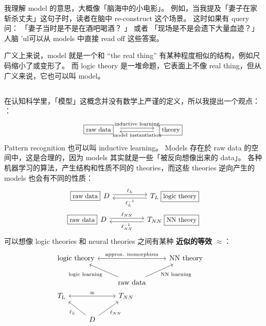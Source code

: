 我理解 model 的意思，大概像「脑海中的小电影」。 例如，当我提及「妻子在家斩杀丈夫」这句子时，读者在脑中 re-construct 这个场景。 这时如果有 query 问： 「妻子当时是不是在酒吧喝酒？ 」 或者 「现场是不是会遗下大量血迹？」  人脑 'ul{可以从 models 中直接 read off 这些答案}。 

广义上来说，model 就是一个和 ``the real thing'' 有某种程度相似的结构，例如尺码缩小了或变形了。  而 logic theory 是一堆命题，它表面上不像 real thing，但从广义来说，它也可以叫 model。

\subsection{}

在认知科学里，「模型」这概念并没有数学上严谨的定义，所以我提出一个观点： \textbf{}：
\begin{equation}
\begin{tikzcd}
\boxed{raw data} \; \arrow[shift left]{rr}{\text{inductive learning}} && \; \boxed{theory} \arrow[shift left]{ll}{\text{model instantiation}}
\end{tikzcd}
\end{equation}
Pattern recognition 也可以叫 inductive learning。  Models 存在於 raw data 的空间中，这是合理的，因为 models 其实就是一些「被反向想像出来的 data」。  各种机器学习的算法，产生结构和性质不同的 theories，而这些 theories 逆向产生的 models 也会有不同的性质：
\begin{eqnarray}
\begin{tikzcd}
\boxed{raw data} \; D \arrow[shift left]{rr}{\ell_L} && T_L \; \boxed{logic theory} \arrow[shift left]{ll}{\ell^{-1}_L}
\end{tikzcd}
\\
\begin{tikzcd}
\boxed{raw data} \; D \arrow[shift left]{rr}{\ell_{NN}} && T_{NN} \; \boxed{NN theory} \arrow[shift left]{ll}{\ell^{-1}_{NN}}
\end{tikzcd}
\end{eqnarray}
可以想像 logic theories 和 neural theories 之间有某种 \textbf{近似的等效} $\approx$： 
\begin{eqnarray}
& \begin{tikzcd}
	\text{logic theory} \arrow[leftrightarrow]{rr}{\text{approx. isomorphism}} && \text{NN theory} \\
	& \text{raw data} \arrow{ul}{\text{logic learning}} \arrow{ur}[swap]{\text{NN learning}}
\end{tikzcd} &
\nonumber \\
& \begin{tikzcd}
	T_{\text{L}} \arrow[leftrightarrow]{rr}{\approx} && T_{NN} \\
		& D \arrow{ul}{\ell_{L}} \arrow{ur}[swap]{\ell_{NN}}
\end{tikzcd} 
\end{eqnarray}
